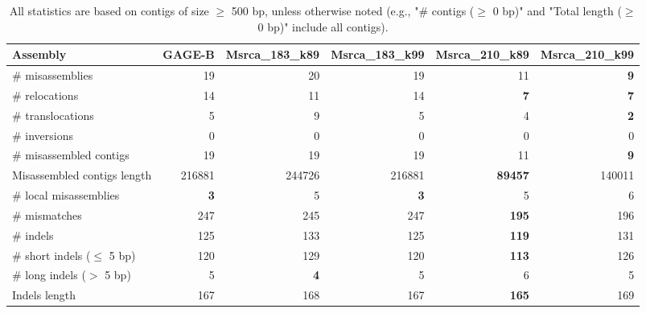 \documentclass[12pt,a4paper]{article}
\begin{document}
\begin{table}[ht]
\begin{center}
\caption{All statistics are based on contigs of size $\geq$ 500 bp, unless otherwise noted (e.g., "\# contigs ($\geq$ 0 bp)" and "Total length ($\geq$ 0 bp)" include all contigs).}
\begin{tabular}{|l*{5}{|r}|}
\hline
Assembly & GAGE-B & Msrca\_183\_k89 & Msrca\_183\_k99 & Msrca\_210\_k89 & Msrca\_210\_k99 \\ \hline
\# misassemblies & 19 & 20 & 19 & 11 & {\bf 9} \\ \hline
\hspace{5mm}\# relocations & 14 & 11 & 14 & {\bf 7} & {\bf 7} \\ \hline
\hspace{5mm}\# translocations & 5 & 9 & 5 & 4 & {\bf 2} \\ \hline
\hspace{5mm}\# inversions & 0 & 0 & 0 & 0 & 0 \\ \hline
\# misassembled contigs & 19 & 19 & 19 & 11 & {\bf 9} \\ \hline
Misassembled contigs length & 216881 & 244726 & 216881 & {\bf 89457} & 140011 \\ \hline
\# local misassemblies & {\bf 3} & 5 & {\bf 3} & 5 & 6 \\ \hline
\# mismatches & 247 & 245 & 247 & {\bf 195} & 196 \\ \hline
\# indels & 125 & 133 & 125 & {\bf 119} & 131 \\ \hline
\hspace{5mm}\# short indels ($\leq$ 5 bp) & 120 & 129 & 120 & {\bf 113} & 126 \\ \hline
\hspace{5mm}\# long indels ($>$ 5 bp) & 5 & {\bf 4} & 5 & 6 & 5 \\ \hline
Indels length & 167 & 168 & 167 & {\bf 165} & 169 \\ \hline
\end{tabular}
\end{center}
\end{table}
\end{document}
